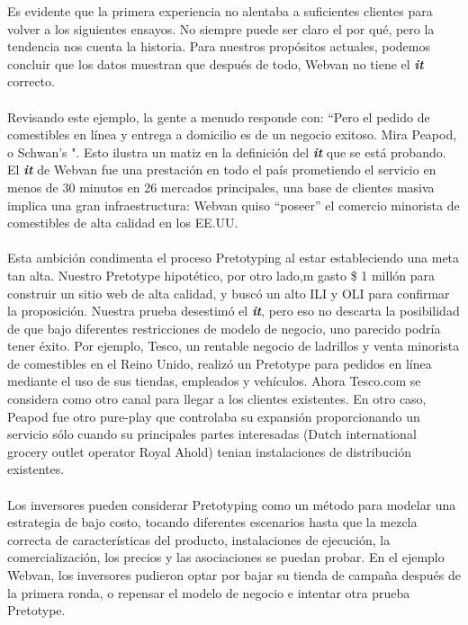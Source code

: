 \documentclass{article}
\begin{document}
Es evidente que la primera experiencia no alentaba a suficientes clientes para volver a los siguientes ensayos. No siempre puede ser claro el por qu\'e, pero la tendencia nos cuenta la historia. Para nuestros prop\'ositos actuales, podemos concluir que los datos muestran que despu\'es de todo, Webvan no tiene el \textbf{\textit{it}} correcto.
\\ \\
Revisando este ejemplo, la gente a menudo responde con: ``Pero el pedido de comestibles en l\'inea y entrega a domicilio es de un negocio exitoso. Mira Peapod, o Schwan's ". Esto ilustra un matiz en la definici\'on del \textbf{\textit{it}} que se est\'a probando. El \textbf{\textit{it}} de Webvan fue una prestaci\'on en todo el pa\'is prometiendo el servicio en menos de 30 minutos en 26 mercados principales, una base de clientes masiva implica una gran infraestructura: Webvan quiso ``poseer'' el comercio minorista de comestibles de alta calidad en los EE.UU.
\\ \\
Esta ambici\'on condimenta el proceso Pretotyping al estar estableciendo una meta tan alta. Nuestro Pretotype hipot\'etico, por otro lado,m gasto \$ 1 mill\'on para construir un sitio web de alta calidad, y busc\'o un alto ILI y OLI para confirmar la proposici\'on. Nuestra prueba desestim\'o el \textbf{\textit{it}}, pero eso no descarta la posibilidad de que bajo diferentes restricciones de modelo de negocio, uno parecido podr\'ia tener \'exito. Por ejemplo, Tesco, un rentable negocio de ladrillos y venta minorista de comestibles en el Reino Unido, realiz\'o un Pretotype para pedidos en l\'inea mediante el uso de sus tiendas, empleados y veh\'iculos. Ahora Tesco.com se considera como otro canal para llegar a los clientes existentes. En otro caso, Peapod fue otro pure-play que controlaba su expansi\'on proporcionando un servicio s\'olo cuando su principales partes interesadas (Dutch international grocery outlet operator Royal Ahold) tenian instalaciones de distribuci\'on existentes.
\\ \\
Los inversores pueden considerar Pretotyping como un m\'etodo para modelar una estrategia de bajo costo, tocando diferentes escenarios hasta que la mezcla correcta de caracter\'isticas del producto, instalaciones de ejecuci\'on, la comercializaci\'on, los precios y las asociaciones se puedan probar. En el ejemplo Webvan, los inversores pudieron optar por bajar su tienda de campa\~na despu\'es de la primera ronda, o repensar el modelo de negocio e intentar otra prueba Pretotype.
\clearpage
\end{document}
